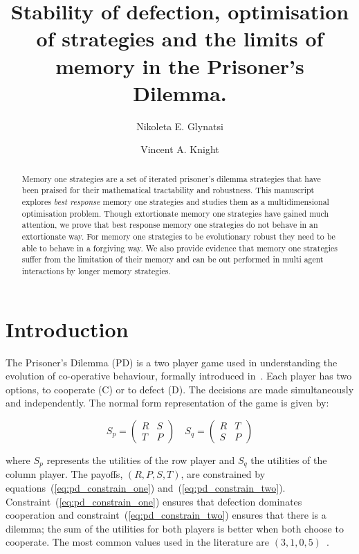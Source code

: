 \documentclass[10pt]{article}
\title{Stability of defection, optimisation of strategies and the limits of
       memory in the Prisoner's Dilemma.}
\author{Nikoleta E. Glynatsi \and Vincent A. Knight}
\date{}
\begin{document}
\maketitle

\begin{abstract}
    Memory one strategies are a set of iterated prisoner’s dilemma strategies
    that have been praised for their mathematical tractability and robustness.
    This manuscript explores \textit{best response} memory one strategies and
    studies them as a multidimensional optimisation problem. Though extortionate
    memory one strategies have gained much attention, we prove that best response
    memory one strategies do not behave in an extortionate way. For memory
    one strategies to be evolutionary robust they need to be able to behave in a
    forgiving way. We also provide evidence that memory one strategies suffer
    from the limitation of their memory and can be out performed in multi agent
    interactions by longer memory strategies.
\end{abstract}

\section{Introduction}\label{section:introduction}

The Prisoner's Dilemma (PD) is a two player game used in understanding the
evolution of co-operative behaviour, formally introduced in~\cite{Flood1958}.
Each player has two options, to cooperate (C) or to defect (D). The decisions
are made simultaneously and independently. The normal form representation of the
game is given by:

\begin{equation}\label{equ:pd_definition}
    S_p =
    \begin{pmatrix}
        R & S  \\
        T & P
    \end{pmatrix}
    \quad
    S_q =
    \begin{pmatrix}
        R & T  \\
        S & P
    \end{pmatrix}
\end{equation}

where \(S_p\) represents the utilities of the row player and \(S_q\) the
utilities of the column player. The payoffs, \((R, P, S, T)\), are constrained
by equations~(\ref{eq:pd_constrain_one}) and~(\ref{eq:pd_constrain_two}).
Constraint~(\ref{eq:pd_constrain_one}) ensures that
defection dominates cooperation and constraint~(\ref{eq:pd_constrain_two})
ensures that there is a dilemma; the sum of the utilities for both players is
better when both choose to cooperate. The most common values used in the literature are
\((3, 1, 0, 5)\)~\cite{Axelrod1981}.
\end{document}
